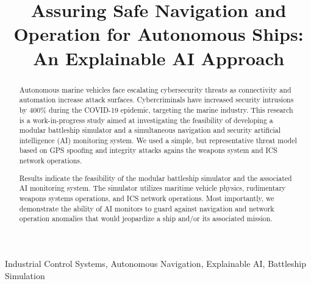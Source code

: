 \documentclass[conference]{IEEEtran}
\begin{document}
\title{Assuring Safe Navigation and Operation for Autonomous Ships: An Explainable AI Approach}

\author{
\IEEEauthorblockA{\textit{} \\
\textit{}\\
 \\
}
\and
{}
\IEEEauthorblockA{\textit{} \\
\textit{}\\
 \\
}
\and
{}
\IEEEauthorblockA{\textit{} \\
\textit{}\\
 \\
}
\and
{}
\IEEEauthorblockA{\textit{} \\
\textit{}\\
 \\
}
\and
{}
\IEEEauthorblockA{\textit{} \\
\textit{}\\
 \\
}
\and
{}
\IEEEauthorblockA{\textit{} \\
\textit{}\\
}}

\maketitle
\begin{abstract}
Autonomous marine vehicles face escalating cybersecurity threats as connectivity and automation increase attack surfaces.  Cybercriminals have increased security intrusions by 400\% during the COVID-19 epidemic, targeting the marine industry.  This research is a work-in-progress study aimed at investigating the feasibility of developing a modular battleship simulator and a simultaneous navigation and security artificial intelligence (AI) monitoring system. We used a simple, but representative threat model based on GPS spoofing and integrity attacks agains the weapons system and ICS network operations. 

Results indicate the feasibility of the modular battleship simulator and the associated AI monitoring system. The simulator utilizes maritime vehicle physics, rudimentary weapons systems operations, and ICS network operations. Most importantly, we demonstrate the ability of AI monitors to guard against navigation and network operation anomalies that would jeopardize a ship and/or its associated mission.
\end{abstract}
\begin{IEEEkeywords}
Industrial Control Systems, Autonomous Navigation, Explainable AI, Battleship Simulation
\end{IEEEkeywords}
\end{document}
